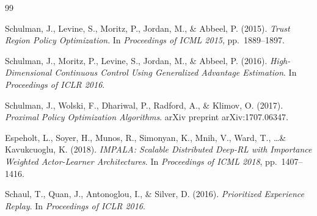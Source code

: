 \documentclass[12pt, a4paper]{article}
\theoremstyle{definition}
\theoremstyle{plain}
\theoremstyle{remark}
\begin{document}
\begin{thebibliography}{99}

Schulman, J., Levine, S., Moritz, P., Jordan, M., \& Abbeel, P. (2015).
\textit{Trust Region Policy Optimization}.
In \textit{Proceedings of ICML 2015}, pp.\ 1889--1897.

Schulman, J., Moritz, P., Levine, S., Jordan, M., \& Abbeel, P. (2016).
\textit{High-Dimensional Continuous Control Using Generalized Advantage Estimation}.
In \textit{Proceedings of ICLR 2016}.

Schulman, J., Wolski, F., Dhariwal, P., Radford, A., \& Klimov, O. (2017).
\textit{Proximal Policy Optimization Algorithms}.
arXiv preprint arXiv:1707.06347.

Espeholt, L., Soyer, H., Munos, R., Simonyan, K., Mnih, V., Ward, T., \ldots \& Kavukcuoglu, K. (2018).
\textit{IMPALA: Scalable Distributed Deep-RL with Importance Weighted Actor-Learner Architectures}.
In \textit{Proceedings of ICML 2018}, pp.\ 1407--1416.

Schaul, T., Quan, J., Antonoglou, I., \& Silver, D. (2016).
\textit{Prioritized Experience Replay}.
In \textit{Proceedings of ICLR 2016}.

\end{thebibliography}
\end{document}
